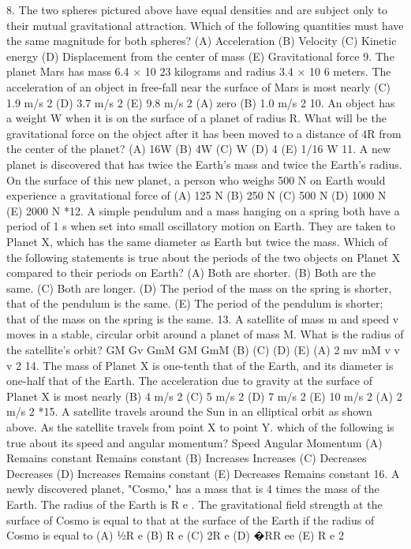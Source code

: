 8. The two spheres pictured above have equal densities and are subject only to their mutual gravitational
attraction. Which of the following quantities must have the same magnitude for both spheres?
(A) Acceleration
(B) Velocity
(C) Kinetic energy
(D) Displacement from the center of mass
(E) Gravitational force
9. The planet Mars has mass 6.4 × 10 23 kilograms and radius 3.4 × 10 6 meters. The acceleration of an object in
free-fall near the surface of Mars is most nearly
(C) 1.9 m/s 2
(D) 3.7 m/s 2
(E) 9.8 m/s 2
(A) zero
(B) 1.0 m/s 2
10. An object has a weight W when it is on the surface of a planet of radius R. What will be the gravitational force
on the object after it has been moved to a distance of 4R from the center of the planet?
(A) 16W
(B) 4W
(C) W
(D) 4
(E) 1/16 W
11. A new planet is discovered that has twice the Earth's mass and twice the Earth's radius. On the surface of this
new planet, a person who weighs 500 N on Earth would experience a gravitational force of
(A) 125 N
(B) 250 N
(C) 500 N
(D) 1000 N
(E) 2000 N
*12. A simple pendulum and a mass hanging on a spring both have a period of 1 s when set into small oscillatory
motion on Earth. They are taken to Planet X, which has the same diameter as Earth but twice the mass. Which
of the following statements is true about the periods of the two objects on Planet X compared to their periods on
Earth?
(A) Both are shorter.
(B) Both are the same.
(C) Both are longer.
(D) The period of the mass on the spring is shorter, that of the pendulum is the same.
(E) The period of the pendulum is shorter; that of the mass on the spring is the same.
13. A satellite of mass m and speed v moves in a stable, circular orbit around a planet of mass M. What is the radius
of the satellite's orbit?
GM
Gv
GmM
GM
GmM
(B)
(C)
(D)
(E)
(A)
2
mv
mM
v
v
v 2
14. The mass of Planet X is one-tenth that of the Earth, and its diameter is one-half that of the Earth. The
acceleration due to gravity at the surface of Planet X is most nearly
(B) 4 m/s 2
(C) 5 m/s 2
(D) 7 m/s 2
(E) 10 m/s 2
(A) 2 m/s 2
*15. A satellite travels around the Sun in an elliptical orbit as shown above. As the satellite travels from point X to
point Y. which of the following is true about its speed and angular momentum?
Speed
Angular Momentum
(A) Remains constant Remains constant
(B) Increases
Increases
(C) Decreases
Decreases
(D) Increases
Remains constant
(E) Decreases
Remains constant
16. A newly discovered planet, "Cosmo," has a mass that is 4 times the mass of the Earth. The radius of the Earth is
R e . The gravitational field strength at the surface of Cosmo is equal to that at the surface of the Earth if the
radius of Cosmo is equal to
(A) 1⁄2R e
(B) R e
(C) 2R e
(D) �RR ee
(E) R e 2



